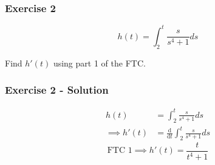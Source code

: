 \documentclass[12pt]{beamer}
\begin{document}
\begin{frame}
	\frametitle{Exercise 2}

	\vfill
	\vfill
	\Large
	\[h(t)=\int_{2}^{t}\frac{s}{s^4+1}ds\]
	\vfill
	\begin{center}
		Find $h'(t)$ using part 1 of the FTC.
	\end{center}
	\vfill
	\vfill
\end{frame}
\begin{frame}
	\frametitle{Exercise 2 - Solution}

	\vfill
	\Large
	\begin{align*}
		h(t)           & = \int_{2}^{t}\frac{s}{s^4+1}ds                               \\
		\implies h'(t) & = \frac{\mathrm{d}}{\mathrm{d}t}\int_{2}^{t}\frac{s}{s^4+1}ds
	\end{align*}
	\vfill
	\[\text{FTC 1}\implies \boxed{h'(t) = \frac{t}{t^4+1}}\]
\end{frame}
\end{document}
